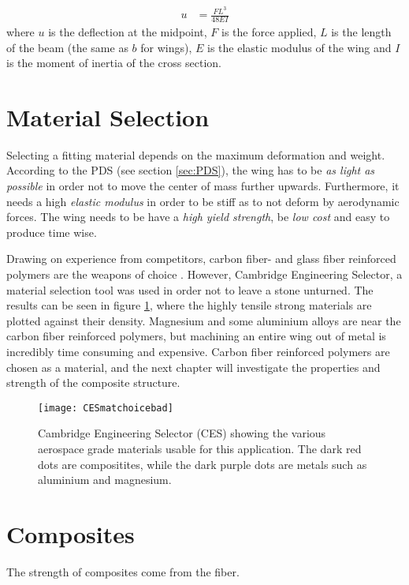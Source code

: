     \begin{align}
      u &= \frac{FL^3}{48EI}
    \end{align}
    where $u$ is the deflection at the midpoint, $F$ is the force applied, $L$ is the length of the beam (the same as $b$ for wings), $E$ is the elastic modulus of the wing and $I$ is the moment of inertia of the cross section.

\section{Material Selection}

  Selecting a fitting material depends on the maximum deformation and weight. According to the PDS (see section \ref{sec:PDS}), the wing has to be \emph{as light as possible} in order not to move the center of mass further upwards. Furthermore, it needs a high \emph{elastic modulus} in order to be stiff as to not deform by aerodynamic forces. The wing needs to be have a \emph{high yield strength}, be \emph{low cost} and easy to produce time wise.

  Drawing on experience from competitors, carbon fiber- and glass fiber reinforced polymers are the weapons of choice \cite{FSwingmaterial}. However, Cambridge Engineering Selector, a material selection tool was used in order not to leave a stone unturned. The results can be seen in figure \ref{fig:CESmatchoice}, where the highly tensile strong materials are plotted against their density. Magnesium and some aluminium alloys are near the carbon fiber reinforced polymers, but machining an entire wing out of metal is incredibly time consuming and expensive. Carbon fiber reinforced polymers are chosen as a material, and the next chapter will investigate the properties and strength of the composite structure.

  \begin{figure}
    \texttt{[image: CESmatchoicebad]}
    \caption{Cambridge Engineering Selector (CES) showing the various aerospace grade materials usable for this application. The dark red dots are compositites, while the dark purple dots are metals such as aluminium and magnesium.}
    \label{fig:CESmatchoice}
  \end{figure}

\section{Composites}

  The strength of composites come from the fiber.

